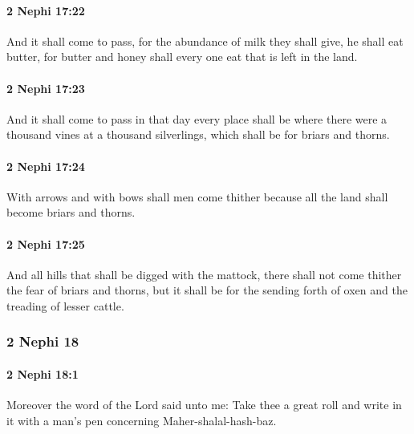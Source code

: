 		\paragraph{2 Nephi 17:22} %
			\label{2NEPHI-17-22}

			And it shall come to pass,
			for the abundance of milk they shall give, he shall eat butter,
			for butter and honey shall every one eat that is left in the land.

		\paragraph{2 Nephi 17:23} %
			\label{2NEPHI-17-23}

			And it shall come to pass in that day every place shall be
			where there were a thousand vines at a thousand silverlings,
			which shall be for briars and thorns.

		\paragraph{2 Nephi 17:24} %
			\label{2NEPHI-17-24}

			With arrows and with bows shall men come thither
			because all the land shall become briars and thorns.

		\paragraph{2 Nephi 17:25} %
			\label{2NEPHI-17-25}

			And all hills that shall be digged with the mattock,
			there shall not come thither the fear of briars and thorns,
			but it shall be for the sending forth of oxen and the treading of lesser cattle.

	\subsubsection{2 Nephi 18} %
		\label{2NEPHI-18}
		
		\paragraph{2 Nephi 18:1} %
			\label{2NEPHI-18-1}

			Moreover the word of the Lord said unto me:
			Take thee a great roll and write in it with a man's pen
			concerning Maher-shalal-hash-baz.

